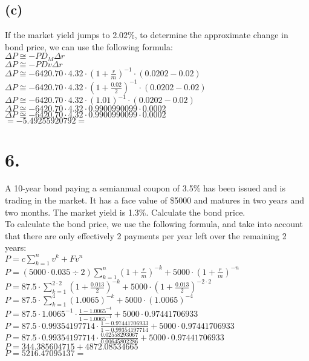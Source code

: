 \documentclass{article}
\begin{document}
{\subsection*{(c)}

If the market yield jumps to 2.02\%, to determine the approximate change in bond price, we can use the following formula: \\
$\Delta P \cong -P D_M \Delta r$ \\
$\Delta P \cong -P Dv \Delta r$ \\
$\Delta P \cong -6420.70 \cdot 4.32 \cdot (1 + \frac{r}{m})^{-1} \cdot (0.0202 - 0.02)$ \\
$\Delta P \cong -6420.70 \cdot 4.32 \cdot (1 + \frac{0.02}{2})^{-1} \cdot (0.0202 - 0.02)$ \\
$\Delta P \cong -6420.70 \cdot 4.32 \cdot (1.01)^{-1} \cdot (0.0202 - 0.02)$ \\
$\Delta P \cong -6420.70 \cdot 4.32 \cdot 0.9900990099 \cdot 0.0002$ \\
$\Delta P \cong -6420.70 \cdot 4.32 \cdot 0.9900990099 \cdot 0.0002$ \\
$= -5.49255920792 = $

}

\section*{6.}
{\Large 

A 10-year bond paying a semiannual coupon of 3.5\% has been issued and is trading in the market. It has a face value of \$5000 and matures in two years and two months. The market yield is 1.3\%. Calculate the bond price. \\

To calculate the bond price, we use the following formula, and take into account that there are only effectively 2 payments per year left over the remaining 2 years: \\ 
$P = c \sum_{k=1}^{n} v^k + Fv^n$ \\
$P = (5000 \cdot 0.035 \div 2) \sum_{k=1}^{n} (1 + \frac{r}{m})^{-k} + 5000 \cdot (1 + \frac{r}{m})^{-n}$ \\
$P = 87.5 \cdot \sum_{k=1}^{2 \cdot 2} (1 + \frac{0.013}{2})^{-k} + 5000 \cdot (1 + \frac{0.013}{2})^{-2 \cdot 2}$ \\
$P = 87.5 \cdot \sum_{k=1}^{4} (1.0065)^{-k} + 5000 \cdot (1.0065)^{-4}$ \\
$P = 87.5 \cdot 1.0065^{-1} \cdot \frac{1 - 1.0065^{-4}}{1 - 1.0065^{-1}} + 5000 \cdot 0.97441706933$ \\
$P = 87.5 \cdot 0.99354197714 \cdot \frac{1 - 0.97441706933}{1 - 0.99354197714} + 5000 \cdot 0.97441706933$ \\
$P = 87.5 \cdot 0.99354197714 \cdot \frac{0.02558293067}{0.00645802286} + 5000 \cdot 0.97441706933$ \\
$P = 344.385604715 + 4872.08534665$ \\ 
$P = 5216.47095137 = $ 

}
\end{document}
